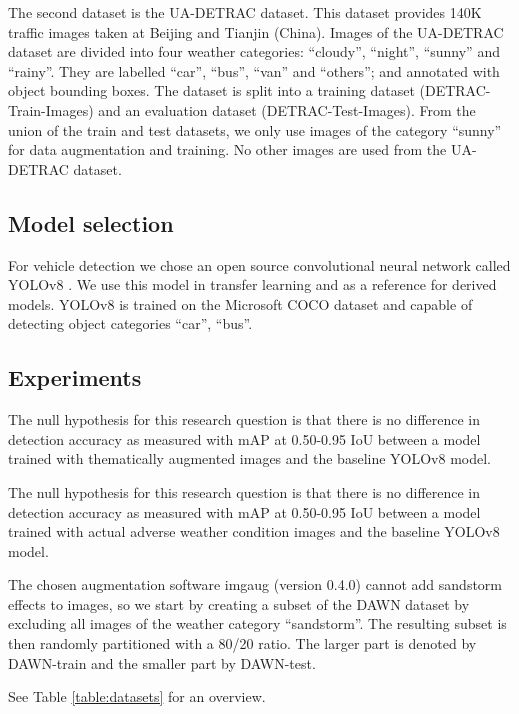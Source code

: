 \documentclass[]{article}
\begin{document}
	The second dataset is the UA-DETRAC \cite{CVIU_UA-DETRAC} dataset. This dataset provides 140K traffic images taken at Beijing and Tianjin (China). Images of the UA-DETRAC dataset are divided into four weather categories: ``cloudy'', ``night'', ``sunny'' and ``rainy''. They are labelled ``car'', ``bus'', ``van'' and ``others''; and annotated with object bounding boxes. The dataset is split into a training dataset (DETRAC-Train-Images) and an evaluation dataset (DETRAC-Test-Images).   From the union of the train and test datasets, we only use images of the category ``sunny'' for data augmentation and training. No other images are used from the UA-DETRAC dataset.

\subsection{Model selection}
 
	For vehicle detection we chose an open source convolutional neural network called YOLO{\small v8} \cite{yolov8_ultralytics}. We use this model in transfer learning and as a reference for derived models. YOLO{\small v8} is trained on the Microsoft COCO dataset \cite{linMicrosoftCOCOCommon2015a} and capable of detecting object categories ``car'', ``bus''.

\subsection{Experiments}

The null hypothesis for this research question is that there is no difference in detection accuracy as measured with mAP at 0.50-0.95 IoU between a model trained with thematically augmented images and the baseline YOLO\small{v8} model.

The null hypothesis for this research question is that there is no difference in detection accuracy as measured with mAP at 0.50-0.95 IoU between a model trained with actual adverse weather condition images and the baseline YOLO\small{v8} model.

	The chosen augmentation software imgaug \cite{imgaug} (version 0.4.0) cannot add sandstorm effects to images, so we start by creating a subset of the DAWN dataset by excluding all images of the weather category ``sandstorm''. The resulting subset is then randomly partitioned with a 80/20 ratio. The larger part is denoted by DAWN-train and the smaller part by DAWN-test.

	See Table \ref{table:datasets} for an overview.
\end{document}
